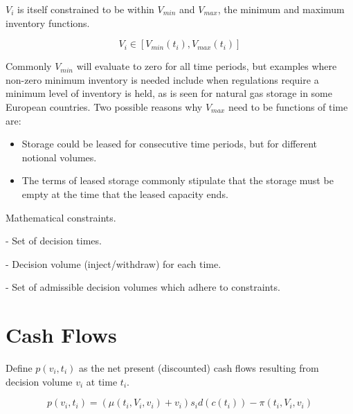 \documentclass{article}
\begin{document}
$V_i$ is itself constrained to be within $V_{min}$ and $V_{max}$, the minimum and maximum
inventory functions.

\begin{equation}
    V_i \in [V_{min}(t_i), V_{max}(t_i)]
\end{equation}

Commonly $V_{min}$ will evaluate to zero for all time periods, but examples
where non-zero minimum inventory is needed include when regulations require a minimum
level of inventory is held, as is seen for natural gas storage in some European countries.
Two possible reasons why $V_{max}$ need to be functions of time are:
\begin{itemize}
    \item Storage could be leased for consecutive time periods, but for different notional
    volumes.
    \item The terms of leased storage commonly stipulate that the storage must be empty
    at the time that the leased capacity ends.
\end{itemize}


Mathematical constraints.

- Set of decision times.

- Decision volume (inject/withdraw) for each time.

- Set of admissible decision volumes which adhere to constraints.


\section{Cash Flows}
Define $p(v_i, t_i)$ as the net present (discounted) cash flows resulting from decision
volume $v_i$ at time $t_i$.

\begin{equation}
    p(v_i, t_i) = (\mu(t_i, V_i, v_i) + v_i) s_i d(c(t_i)) - \pi(t_i, V_i, v_i)
\end{equation}
\end{document}
